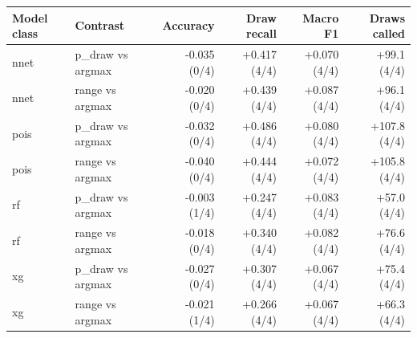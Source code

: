 
\begin{tabular}{llrrrr}
\toprule
Model class & Contrast & Accuracy & Draw recall & Macro F1 & Draws called\\
\midrule
nnet & p\_draw vs argmax & -0.035 (0/4) & +0.417 (4/4) & +0.070 (4/4) & +99.1 (4/4)\\
nnet & range vs argmax & -0.020 (0/4) & +0.439 (4/4) & +0.087 (4/4) & +96.1 (4/4)\\
pois & p\_draw vs argmax & -0.032 (0/4) & +0.486 (4/4) & +0.080 (4/4) & +107.8 (4/4)\\
pois & range vs argmax & -0.040 (0/4) & +0.444 (4/4) & +0.072 (4/4) & +105.8 (4/4)\\
rf & p\_draw vs argmax & -0.003 (1/4) & +0.247 (4/4) & +0.083 (4/4) & +57.0 (4/4)\\
rf & range vs argmax & -0.018 (0/4) & +0.340 (4/4) & +0.082 (4/4) & +76.6 (4/4)\\
xg & p\_draw vs argmax & -0.027 (0/4) & +0.307 (4/4) & +0.067 (4/4) & +75.4 (4/4)\\
xg & range vs argmax & -0.021 (1/4) & +0.266 (4/4) & +0.067 (4/4) & +66.3 (4/4)\\
\bottomrule
\end{tabular}
